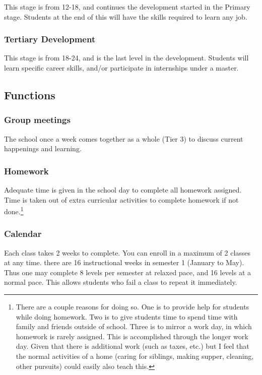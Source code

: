 \documentclass[CSHFoundation.tex]{subfiles}
\begin{document}
This stage is from 12-18, and continues the development started in the Primary stage. Students at the end of this will have the skills required to learn any job.

\subsubsection{Tertiary Development}

This stage is from 18-24, and is the last level in the development. Students will learn specific career skills, and/or participate in internships under a master.

\subsection{Functions}

\subsubsection{Group meetings}

The school once a week comes together as a whole (Tier 3) to discuss current happenings and learning.

\subsubsection{Homework}

Adequate time is given in the school day to complete all homework assigned. Time is taken out of extra curricular activities to complete homework if not done.\footnote{There are a couple reasons for doing so. One is to provide help for students while doing homework. Two is to give students time to spend time with family and friends outside of school. Three is to mirror a work day, in which homework is rarely assigned. This is accomplished through the longer work day. Given that there is additional work (such as taxes, etc.) but I feel that the normal activities of a home (caring for siblings, making supper, cleaning, other pursuits) could easily also teach this.} 

\subsubsection{Calendar}

Each class takes 2 weeks to complete. You can enroll in a maximum of 2 classes at any time. there are 16 instructional weeks in semester 1 (January to May). Thus one may complete 8 levels per semester at relaxed pace, and 16 levels at a normal pace. This allows students who fail a class to repeat it immediately.
\end{document}
